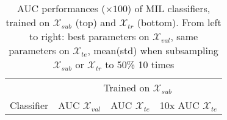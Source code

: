 \documentclass[10pt,conference,a4paper]{IEEEtran}
\begin{document}
\begin{table}[ht]

\caption{AUC performances ($\times 100$) of MIL classifiers, trained on $\mathcal{X}_{sub}$ (top) and $\mathcal{X}_{tr}$ (bottom). From left to right: best parameters on $\mathcal{X}_{val}$,  same parameters on $\mathcal{X}_{te}$, mean(std) when subsampling $\mathcal{X}_{sub}$ or $\mathcal{X}_{tr}$ to 50\% 10 times}

\begin{center}
\begin{tabular}{l l l l}






 & \multicolumn{3}{c}{Trained on $\mathcal{X}_{sub}$} \\
  Classifier &    AUC $\mathcal{X}_{val}$ & AUC $\mathcal{X}_{te}$ & 10x AUC $\mathcal{X}_{te}$ \\



\end{tabular}
\end{center}
\end{table}
\end{document}
